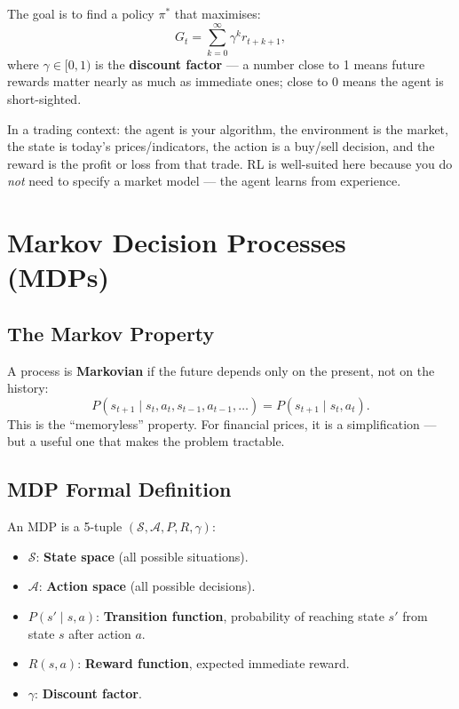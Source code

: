 \documentclass[12pt,a4paper]{article}
\begin{document}
The goal is to find a policy $\pi^*$ that maximises:
\begin{equation}
  G_t = \sum_{k=0}^{\infty} \gamma^k r_{t+k+1},
  \label{eq:return}
\end{equation}
where $\gamma \in [0,1)$ is the \textbf{discount factor} --- a number
close to 1 means future rewards matter nearly as much as immediate ones;
close to 0 means the agent is short-sighted.

\begin{finbox}
In a trading context: the agent is your algorithm, the environment is the
market, the state is today's prices/indicators, the action is a buy/sell
decision, and the reward is the profit or loss from that trade.
RL is well-suited here because you do \emph{not} need to specify a market
model --- the agent learns from experience.
\end{finbox}

\section{Markov Decision Processes (MDPs)}

\subsection{The Markov Property}

A process is \textbf{Markovian} if the future depends only on the present,
not on the history:
\begin{equation}
  P(s_{t+1} \mid s_t, a_t, s_{t-1}, a_{t-1}, \ldots) =
  P(s_{t+1} \mid s_t, a_t).
\end{equation}
This is the ``memoryless'' property.  For financial prices, it is a
simplification --- but a useful one that makes the problem tractable.

\subsection{MDP Formal Definition}

An MDP is a 5-tuple $(\mathcal{S}, \mathcal{A}, P, R, \gamma)$:
\begin{itemize}[nosep]
  \item $\mathcal{S}$: \textbf{State space} (all possible situations).
  \item $\mathcal{A}$: \textbf{Action space} (all possible decisions).
  \item $P(s' \mid s, a)$: \textbf{Transition function}, probability of
        reaching state $s'$ from state $s$ after action $a$.
  \item $R(s, a)$: \textbf{Reward function}, expected immediate reward.
  \item $\gamma$: \textbf{Discount factor}.
\end{itemize}
\end{document}
